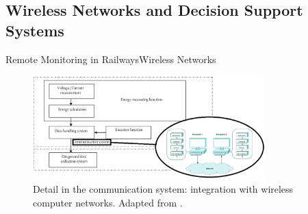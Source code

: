 \subsection{Wireless Networks and Decision Support Systems}

\begin{frame}{Remote Monitoring in Railways}{Wireless Networks}

\begin{figure}[h!]
	\centering
	\includegraphics[width=0.8\textwidth,keepaspectratio]{figures/34.SmartM/EMS2}
	\caption{Detail in the communication system: integration with wireless computer networks. Adapted from \cite{comer2008}.}
\end{figure}

\end{frame}


